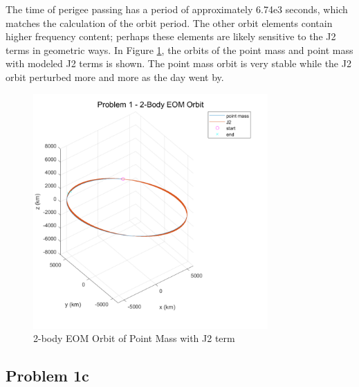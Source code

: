 \documentclass[conf]{new-aiaa}
\begin{document}
The time of perigee passing has a period of approximately 6.74e3 seconds, which matches the calculation of the orbit period. The other orbit elements contain higher frequency content; perhaps these elements are likely sensitive to the J2 terms in geometric ways. In Figure \ref{fig:prob_1b_2bod}, the orbits of the point mass and point mass with modeled J2 terms is shown. The point mass orbit is very stable while the J2 orbit perturbed more and more as the day went by. 

\begin{figure}
	\centering 
	\includegraphics[width=0.8\textwidth]{Problem 1 - 2-Body EOM Orbit.pdf}
	\caption{2-body EOM Orbit of Point Mass with J2 term}
	\label{fig:prob_1b_2bod}
\end{figure}

\newpage

\subsection*{Problem 1c} 

\begin{center}
	 \\
\end{center}
\end{document}
